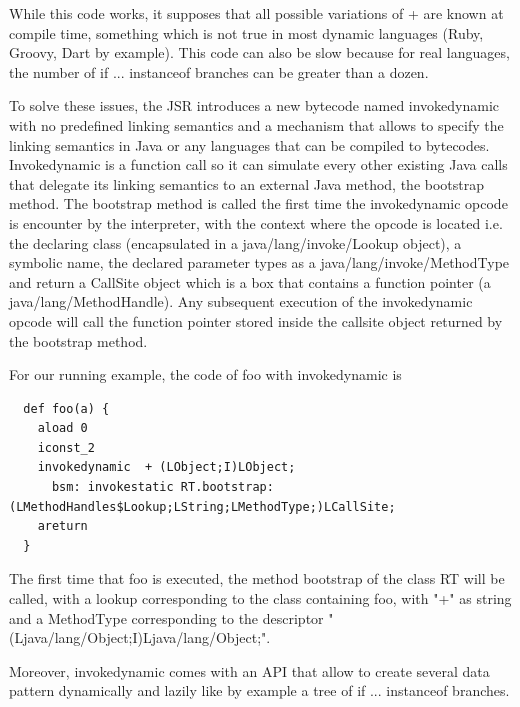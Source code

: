 \documentclass{sigplanconf}
\def \Jsr{JSR\xspace}
\begin{document}
      While this code works, it supposes that all possible variations of + are known at compile time,
      something which is not true in most dynamic languages (Ruby, Groovy, Dart by example).
      This code can also be slow because for real languages, the number of if ... instanceof branches
      can be greater than a dozen. 
      
      To solve these issues, the \Jsr introduces a new bytecode named invokedynamic with no predefined
      linking semantics and a mechanism that allows to specify the linking semantics in Java
      or any languages that can be compiled to bytecodes.
      Invokedynamic is a function call so it can simulate every other existing Java calls that delegate
      its linking semantics to an external Java method, the bootstrap method.
      The bootstrap method is called the first time the invokedynamic opcode is encounter by the interpreter,
      with the context where the opcode is located i.e.
      the declaring class (encapsulated in a java/lang/invoke/Lookup object), a symbolic name,
      the declared parameter types as a java/lang/invoke/MethodType and return
      a CallSite object which is a box that contains a function pointer (a java/lang/MethodHandle).
      Any subsequent execution of the invokedynamic opcode will call the function pointer
      stored inside the callsite object returned by the bootstrap method.
      
      For our running example, the code of foo with invokedynamic is
     {\tiny      
      \begin{verbatim}
  def foo(a) {
    aload 0
    iconst_2 
    invokedynamic  + (LObject;I)LObject;
      bsm: invokestatic RT.bootstrap:(LMethodHandles$Lookup;LString;LMethodType;)LCallSite;
    areturn 
  }
      \end{verbatim}
      }

      The first time that foo is executed, the method bootstrap of the class RT will be called, with a lookup corresponding to the class containing foo,
      with "+" as string and a MethodType corresponding to the descriptor "(Ljava/lang/Object;I)Ljava/lang/Object;".

      

      Moreover, invokedynamic comes with an API that allow to create several data pattern
      dynamically and lazily like by example a tree of if ... instanceof branches.
\end{document}

